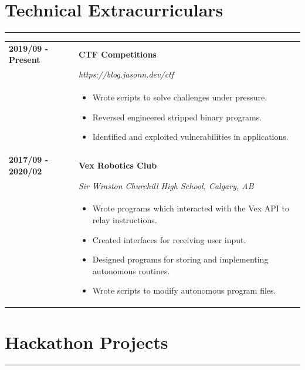 \documentclass[letterpaper]{article}
\newcommand{\sect}[1]{\section*{#1}
                        {\color{cyan}
                        \rule{\textwidth}{1pt}
                        \vspace{-1ex}}}
\begin{document}
    \sect{Technical Extracurriculars}

        \begin{tabular}{p{} p{}} 
            \textbf{2019/09 - Present} & \textbf{CTF Competitions} \\
            & \emph{https://blog.jasonn.dev/ctf} \\
            & \begin{itemize}
                \item Wrote scripts to solve challenges under pressure.
                \item Reversed engineered stripped binary programs.
                \item Identified and exploited vulnerabilities in applications. 
            \end{itemize}
            \\
            \textbf{2017/09 - 2020/02} & \textbf{Vex Robotics Club} \\
            & \emph{Sir Winston Churchill High School, Calgary, AB} \\
            & \begin{itemize}
                \item Wrote programs which interacted with the Vex API to relay instructions.
                \item Created interfaces for receiving user input.
                \item Designed programs for storing and implementing autonomous routines.
                \item Wrote scripts to modify autonomous program files.
            \end{itemize}
        \end{tabular}

    \sect{Hackathon Projects}
\end{document}
